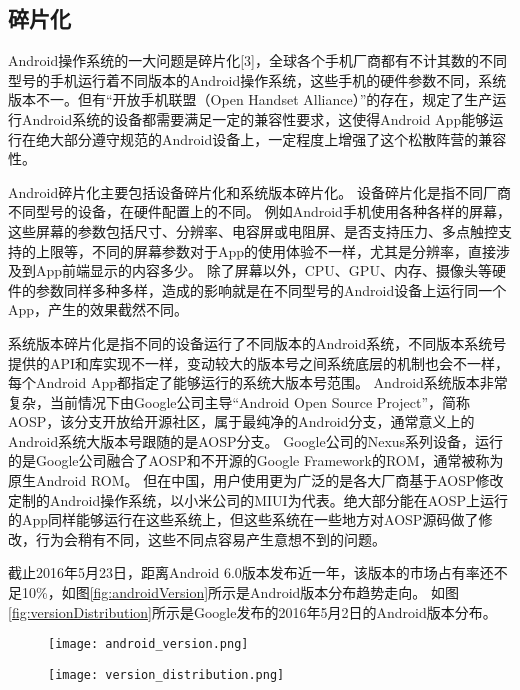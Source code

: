 \subsection{碎片化}

Android操作系统的一大问题是碎片化[3]，全球各个手机厂商都有不计其数的不同型号的手机运行着不同版本的Android操作系统，这些手机的硬件参数不同，系统版本不一。但有“开放手机联盟（Open Handset Alliance）”的存在，规定了生产运行Android系统的设备都需要满足一定的兼容性要求，这使得Android App能够运行在绝大部分遵守规范的Android设备上，一定程度上增强了这个松散阵营的兼容性。

Android碎片化主要包括设备碎片化和系统版本碎片化。
设备碎片化是指不同厂商不同型号的设备，在硬件配置上的不同。
例如Android手机使用各种各样的屏幕，这些屏幕的参数包括尺寸、分辨率、电容屏或电阻屏、是否支持压力、多点触控支持的上限等，不同的屏幕参数对于App的使用体验不一样，尤其是分辨率，直接涉及到App前端显示的内容多少。
除了屏幕以外，CPU、GPU、内存、摄像头等硬件的参数同样多种多样，造成的影响就是在不同型号的Android设备上运行同一个App，产生的效果截然不同。

系统版本碎片化是指不同的设备运行了不同版本的Android系统，不同版本系统号提供的API和库实现不一样，变动较大的版本号之间系统底层的机制也会不一样，每个Android App都指定了能够运行的系统大版本号范围。
Android系统版本非常复杂，当前情况下由Google公司主导“Android Open Source Project”，简称AOSP，该分支开放给开源社区，属于最纯净的Android分支，通常意义上的Android系统大版本号跟随的是AOSP分支。
Google公司的Nexus系列设备，运行的是Google公司融合了AOSP和不开源的Google Framework的ROM，通常被称为原生Android ROM。
但在中国，用户使用更为广泛的是各大厂商基于AOSP修改定制的Android操作系统，以小米公司的MIUI为代表。绝大部分能在AOSP上运行的App同样能够运行在这些系统上，但这些系统在一些地方对AOSP源码做了修改，行为会稍有不同，这些不同点容易产生意想不到的问题。

截止2016年5月23日，距离Android 6.0版本发布近一年，该版本的市场占有率还不足10\%，如图\ref{fig:androidVersion}所示是Android版本分布趋势走向。
如图\ref{fig:versionDistribution}所示是Google发布的2016年5月2日的Android版本分布。

\begin{figure}[!htp]
	\centering
	\texttt{[image: android\_version.png]}
\end{figure}

\begin{figure}[!htp]
	\centering
	\texttt{[image: version\_distribution.png]}
\end{figure}


